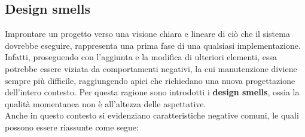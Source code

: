 \documentclass{article}
\begin{document}
\subsection*{Design smells}
\large
Improntare un progetto verso una visione chiara e lineare di ciò che il sistema dovrebbe eseguire, rappresenta una prima fase di una qualsiasi implementazione. Infatti, proseguendo con l'aggiunta e la modifica di ulteriori elementi, essa potrebbe essere viziata da comportamenti negativi, la cui manutenzione diviene sempre più difficile, raggiungendo apici che richiedano una nuova progettazione dell'intero contesto. Per questa ragione sono introdotti i \textbf{design smells}, ossia la qualità momentanea non è all'altezza delle aspettative.\vspace*{14pt}\\
Anche in questo contesto si evidenziano caratteristiche negative comuni, le quali possono essere riassunte come segue:
\end{document}
